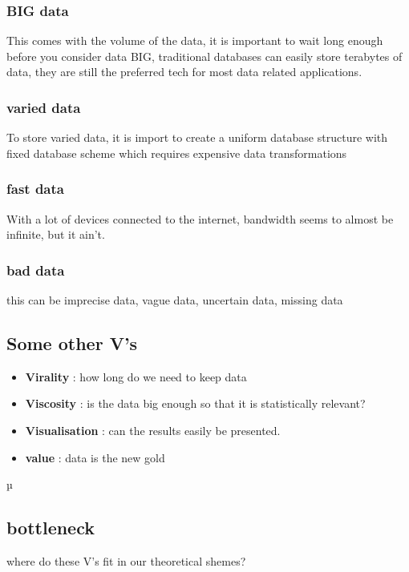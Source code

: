 \documentclass{report}
\begin{document}
			\subsubsection{BIG data}
				This comes with the volume of the data, it is important to wait long enough before you consider data BIG, traditional databases can easily store terabytes of data, they are still the preferred tech for most data related applications.
			\subsubsection{varied data}
				To store varied data, it is import to create a uniform database structure with fixed database scheme which requires expensive data transformations
			\subsubsection{fast data}
				With a lot of devices connected to the internet, bandwidth seems to almost be infinite, but it ain't.
			\subsubsection{bad data}
				this can be imprecise data, vague data, uncertain data, missing data
			\subsection{Some other V's}
				\begin{itemize}
					\item \textbf{Virality} : how long do we need to 			
					keep data
					\item \textbf{Viscosity} : is the data big enough so that it is statistically relevant?
					\item \textbf{Visualisation} : can the results easily be presented.
					\item \textbf{value} : data is the new gold
				\end{itemize}µ
			\subsection{bottleneck}
				where do these V's fit in our theoretical shemes?
\end{document}
